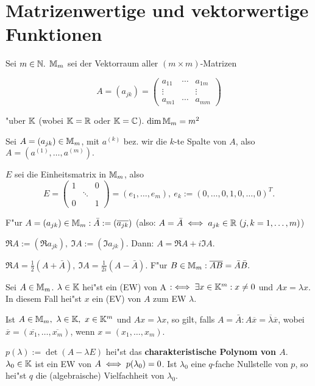 \documentclass[a4paper,twoside,DIV15,BCOR12mm]{scrbook}
\begin{document}
\chapter{Matrizenwertige und vektorwertige Funktionen}

Sei $m\in\mathbb{N}.$ $\mathbb{M}_m$ sei der Vektorraum aller $(m\times m)$-Matrizen

$$A=(a_{jk}) = \begin{pmatrix}
a_{11} & \cdots & a_{1m}\\
\vdots &        & \vdots\\
a_{m1} & \cdots & a_{mm}
\end{pmatrix}$$

"uber $\mathbb{K}$ (wobei $\mathbb{K}=\mathbb{R}$ oder $\mathbb{K}=\mathbb{C}$). $\dim \mathbb{M}_m = m^2$

Sei $A=(a_{jk})\in\mathbb{M}_m$, mit $a^{(k)}$ bez. wir die $k$-te Spalte von $A$, also $A=(a^{(1)},\ldots,a^{(m)}).$

$E$ sei die Einheitsmatrix in $\mathbb{M}_m$, also
$$E=\begin{pmatrix}
1 &  & 0\\
  & \ddots &\\
0 &  & 1
\end{pmatrix} = (e_1,\ldots,e_m),\ e_k:=(0,\ldots,0,1,0,\ldots,0)^T.$$

F"ur $A=(a_{jk})\in\mathbb{M}_m: \bar{A} := (\overline{a_{jk}})$ (also: $A=\bar{A} \iff a_{jk}\in \mathbb{R}\ (j,k=1,\ldots,m)$)

$\Re A:=(\Re a_{jk}),\ \Im A:=(\Im a_{jk}).$ Dann: $A=\Re A+i\Im A.$

$\Re A = \frac{1}{2}(A+\bar{A}),\ \Im A = \frac{1}{2i}(A-\bar{A}).$ F"ur $B\in\mathbb{M}_m: \overline{AB} = \bar{A}\bar{B}.$

Sei $A\in\mathbb{M}_m$. $\lambda\in\mathbb{K}$ hei"st ein  (EW) von A $:\iff \exists x\in \mathbb{K}^m: x\ne 0$ und $Ax=\lambda x$. In diesem Fall hei"st $x$ ein  (EV) von $A$ zum EW $\lambda$.

Ist $A\in\MdM_m,\ \lambda\in\MdK,\ x\in\MdK^m$ und $Ax=\lambda x$, so gilt, falls $A=\bar{A}: A\overline{x} = \overline{\lambda} \overline{x}$, wobei $\overline{x} = (\overline{x_1},\ldots,\overline{x_m})$, wenn $x=(x_1,\ldots,x_m).$

$p(\lambda):=\det(A-\lambda E)$ hei"st das \textbf{charakteristische Polynom von $A$}. $\lambda_0\in\mathbb{K}$ ist ein EW von $A \iff p(\lambda_0)=0$. Ist $\lambda_0$ eine $q$-fache Nullstelle von $p$, so hei"st $q$ die (algebraische) Vielfachheit von $\lambda_0$.
\end{document}

